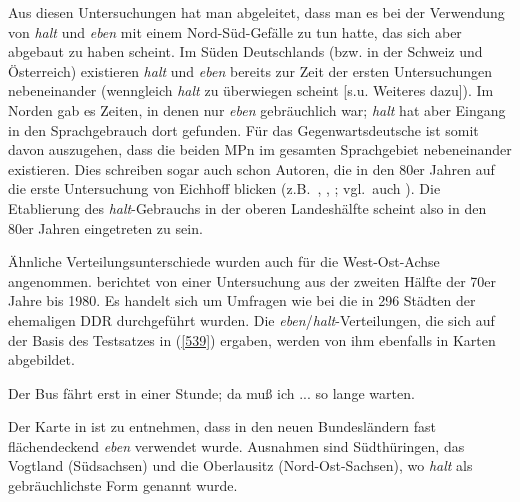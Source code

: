 Aus diesen Untersuchungen hat man abgeleitet, dass man es bei der Verwendung von \textit{halt} und \textit{eben} mit einem Nord-Süd-Gefälle zu tun hatte, das sich aber abgebaut zu haben scheint. Im Süden Deutschlands (bzw. in der Schweiz und Österreich) existieren \textit{halt} und \textit{eben} bereits zur Zeit der ersten Untersuchungen nebeneinander (wenngleich \textit{halt} zu überwiegen scheint [s.u. Weiteres dazu]). Im Norden gab es Zeiten, in denen nur \textit{eben} gebräuchlich war; \textit{halt} hat aber Eingang in den Sprachgebrauch dort gefunden. Für das Gegenwartsdeutsche ist somit davon auszugehen, dass die beiden MPn im gesamten Sprachgebiet nebeneinander existieren. Dies schreiben sogar auch schon Autoren, die in den 80er Jahren auf die erste Untersuchung von Eichhoff blicken (z.B.\ \citealt[78]{Hartog1982}, \citealt[97]{Dahl1988}, \citealt[124]{Thurmair1989}; vgl.\ auch \citealt[93]{Autenrieth2002}). Die Etablierung des \textit{halt}-Gebrauchs in der oberen Landeshälfte scheint also in den 80er Jahren eingetreten zu sein.

Ähnliche Verteilungsunterschiede wurden auch für die West-Ost-Achse ange\-nommen. \citet{Protze1997} berichtet von einer Untersuchung aus der zweiten Hälfte der 70er Jahre bis 1980. Es handelt sich um Umfragen wie bei \citet{Eichhoff1977, Eichhoff1978} die in 296 Städten der ehemaligen DDR durchgeführt wurden. Die \textit{eben}/\textit{halt}-Verteilungen, die sich auf der Basis des Testsatzes in (\ref{539}) ergaben, werden von ihm ebenfalls in Karten abgebildet.


\begin{exe}
	\ex\label{539} 
    Der Bus fährt erst in einer Stunde; da muß ich ... so lange warten. 
    \newline		
	\hbox{}\hfill\hbox{\citet[167]{Protze1997}}    
\end{exe}
Der Karte in \citet[266]{Protze1997} ist zu entnehmen, dass in den neuen Bundesländern fast flächendeckend \textit{eben} verwendet wurde. Ausnahmen sind Südthüringen, das Vogtland (Südsachsen) und die Oberlausitz (Nord-Ost-Sachsen), wo \textit{halt} als gebräuchlichste Form genannt wurde.

